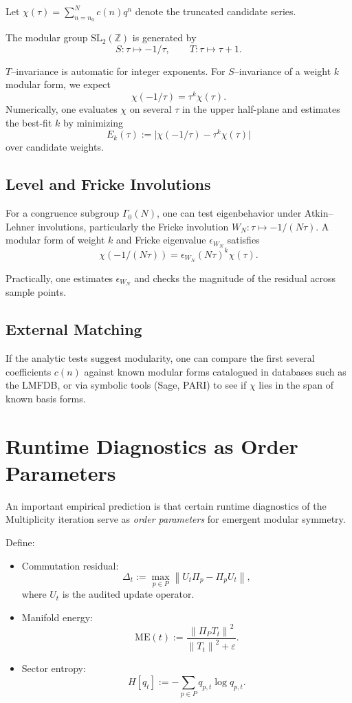 \documentclass[11pt]{article}
\theoremstyle{definition}
\theoremstyle{plain}
\theoremstyle{remark}
\newcommand{\Zbb}{\mathbb{Z}}
\newcommand{\SL}{\mathrm{SL}}
\newcommand{\norm}[1]{\left\lVert #1 \right\rVert}
\begin{document}
Let $\chi(\tau) = \sum_{n=n_0}^N c(n) q^n$ denote the truncated candidate series.

The modular group $\SL_2(\Zbb)$ is generated by
\[
  S: \tau \mapsto -1/\tau,\qquad T: \tau \mapsto \tau + 1.
\]

$T$--invariance is automatic for integer exponents.
For $S$--invariance of a weight $k$ modular form, we expect
\begin{equation}
  \chi(-1/\tau) = \tau^k \chi(\tau).
\end{equation}
Numerically, one evaluates $\chi$ on several $\tau$ in the upper half-plane and estimates the best-fit $k$ by minimizing
\[
  E_k(\tau) := \bigl|\chi(-1/\tau) - \tau^k \chi(\tau)\bigr|
\]
over candidate weights.

\subsection{Level and Fricke Involutions}

For a congruence subgroup $\Gamma_0(N)$, one can test eigenbehavior under Atkin--Lehner involutions, particularly the Fricke involution $W_N:\tau\mapsto -1/(N\tau)$.
A modular form of weight $k$ and Fricke eigenvalue $\epsilon_{W_N}$ satisfies
\[
  \chi(-1/(N\tau)) = \epsilon_{W_N} (N\tau)^k \chi(\tau).
\]

Practically, one estimates $\epsilon_{W_N}$ and checks the magnitude of the residual across sample points.

\subsection{External Matching}

If the analytic tests suggest modularity, one can compare the first several coefficients $c(n)$ against known modular forms catalogued in databases such as the LMFDB, or via symbolic tools (Sage, PARI) to see if $\chi$ lies in the span of known basis forms.

\section{Runtime Diagnostics as Order Parameters}

An important empirical prediction is that certain runtime diagnostics of the Multiplicity iteration serve as \emph{order parameters} for emergent modular symmetry.

Define:
\begin{itemize}[leftmargin=1.5em]
  \item Commutation residual:
  \[
    \Delta_t := \max_{p \in P} \norm{U_t \Pi_p - \Pi_p U_t},
  \]
  where $U_t$ is the audited update operator.
  \item Manifold energy:
  \[
    \mathrm{ME}(t) := \frac{\norm{\Pi_P T_t}^2}{\norm{T_t}^2 + \varepsilon}.
  \]
  \item Sector entropy:
  \[
    H[q_t] := -\sum_{p\in P} q_{p,t} \log q_{p,t}.
  \]
\end{itemize}
\end{document}
